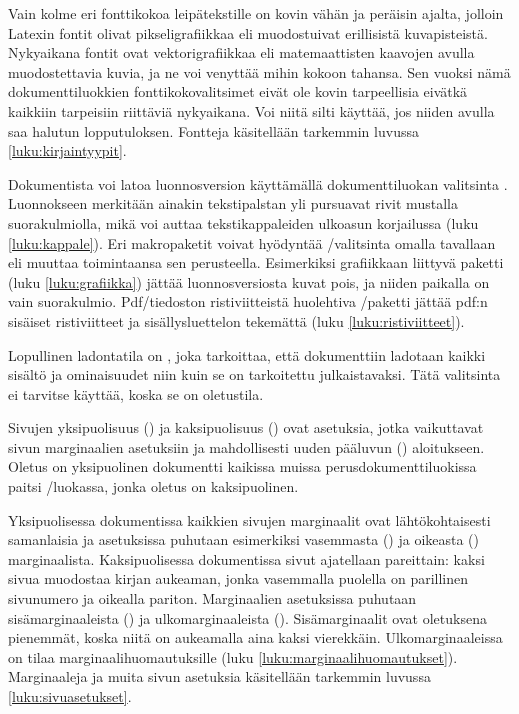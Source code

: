 Vain kolme eri fonttikokoa leipätekstille on kovin vähän ja peräisin
ajalta, jolloin Latexin fontit olivat pik\-seli\-gra\-fiik\-kaa eli
muodostuivat erillisistä kuvapisteistä. Nyky\-aika\-na fontit ovat
vek\-tori\-gra\-fiik\-kaa eli matemaattisten kaavojen avulla
muodostettavia kuvia, ja ne voi venyttää mihin kokoon tahansa. Sen
vuoksi nämä dokumenttiluokkien fonttikokovalitsimet eivät ole kovin
tarpeellisia eivätkä kaikkiin tarpeisiin riittäviä nykyaikana. Voi niitä
silti käyttää, jos niiden avulla saa halutun lopputuloksen. Fontteja
käsitellään tarkemmin luvussa \ref{luku:kirjaintyypit}.

Dokumentista%
 voi latoa luonnosversion käyttämällä
dokumenttiluokan valitsinta . Luonnokseen merkitään ainakin
tekstipalstan yli pursuavat rivit mustalla suorakulmiolla, mikä voi
auttaa tekstikappaleiden ulkoasun korjailussa (luku \ref{luku:kappale}).
Eri makropaketit voivat hyödyntää \-/valitsinta omalla
tavallaan eli muuttaa toimintaansa sen perusteella. Esimerkiksi
grafiikkaan liittyvä paketti  (luku
\ref{luku:grafiikka}) jättää luonnosversiosta kuvat pois, ja niiden
paikalla on vain suorakulmio. Pdf\-/tiedoston ristiviitteistä huolehtiva
\-/paketti jättää pdf:n sisäiset ristiviitteet ja
sisällysluettelon tekemättä (luku \ref{luku:ristiviitteet}).

Lopullinen%
 ladontatila on , joka tarkoittaa, että
dokumenttiin ladotaan kaikki sisältö ja ominaisuudet niin kuin se on
tarkoitettu julkaistavaksi. Tätä valitsinta ei tarvitse käyttää, koska
se on oletustila.

Sivujen%
 yksipuolisuus () ja
kaksipuolisuus () ovat asetuksia, jotka vaikuttavat sivun
marginaalien asetuksiin ja mahdollisesti uuden pääluvun () aloitukseen. Oletus on yksipuolinen dokumentti kaikissa
muissa perusdokumenttiluokissa paitsi \-/luokassa, jonka
oletus on kaksipuolinen.

Yksipuolisessa dokumentissa kaikkien sivujen marginaalit ovat
lähtökohtaisesti samanlaisia ja asetuksissa puhutaan esimerkiksi
vasemmasta () ja oikeasta ()
marginaalista. Kaksipuolisessa dokumentissa sivut ajatellaan pareittain:
kaksi sivua muodostaa kirjan aukeaman, jonka vasemmalla puolella on
parillinen sivunumero ja oikealla pariton. Marginaalien asetuksissa
puhutaan sisämarginaaleista () ja ulkomarginaaleista
(). Sisämarginaalit ovat oletuksena pienemmät, koska
niitä on aukeamalla aina kaksi vierekkäin. Ulkomarginaaleissa on tilaa
marginaalihuomautuksille (luku \ref{luku:marginaalihuomautukset}).
Marginaaleja ja muita sivun asetuksia käsitellään tarkemmin luvussa
\ref{luku:sivuasetukset}.

